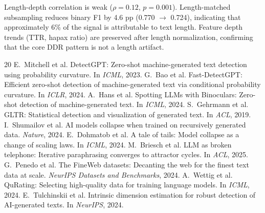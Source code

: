 \documentclass[11pt,a4paper]{article}
\begin{document}
Length-depth correlation is weak ($\rho = 0.12$, $p = 0.001$). Length-matched subsampling reduces binary F1 by 4.6 pp (0.770 $\to$ 0.724), indicating that approximately 6\% of the signal is attributable to text length. Feature depth trends (TTR, hapax ratio) are preserved after length normalization, confirming that the core DDR pattern is not a length artifact.

\begin{thebibliography}{20}
 E.~Mitchell et al. DetectGPT: Zero-shot machine-generated text detection using probability curvature. In \emph{ICML}, 2023.
 G.~Bao et al. Fast-DetectGPT: Efficient zero-shot detection of machine-generated text via conditional probability curvature. In \emph{ICLR}, 2024.
 A.~Hans et al. Spotting LLMs with Binoculars: Zero-shot detection of machine-generated text. In \emph{ICML}, 2024.
 S.~Gehrmann et al. GLTR: Statistical detection and visualization of generated text. In \emph{ACL}, 2019.
 I.~Shumailov et al. AI models collapse when trained on recursively generated data. \emph{Nature}, 2024.
 E.~Dohmatob et al. A tale of tails: Model collapse as a change of scaling laws. In \emph{ICML}, 2024.
 M.~Briesch et al. LLM as broken telephone: Iterative paraphrasing converges to attractor cycles. In \emph{ACL}, 2025.
 G.~Penedo et al. The FineWeb datasets: Decanting the web for the finest text data at scale. \emph{NeurIPS Datasets and Benchmarks}, 2024.
 A.~Wettig et al. QuRating: Selecting high-quality data for training language models. In \emph{ICML}, 2024.
 E.~Tulchinskii et al. Intrinsic dimension estimation for robust detection of AI-generated texts. In \emph{NeurIPS}, 2024.
\end{thebibliography}
\end{document}
